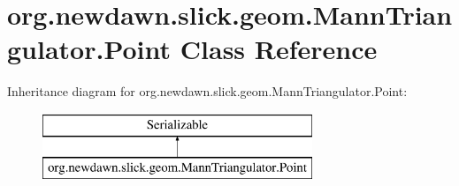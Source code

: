 \hypertarget{classorg_1_1newdawn_1_1slick_1_1geom_1_1_mann_triangulator_1_1_point}{}\section{org.\+newdawn.\+slick.\+geom.\+Mann\+Triangulator.\+Point Class Reference}
\label{classorg_1_1newdawn_1_1slick_1_1geom_1_1_mann_triangulator_1_1_point}
Inheritance diagram for org.\+newdawn.\+slick.\+geom.\+Mann\+Triangulator.\+Point\+:\begin{figure}[H]
\begin{center}
\leavevmode
\includegraphics[height=2.000000cm]{classorg_1_1newdawn_1_1slick_1_1geom_1_1_mann_triangulator_1_1_point}
\end{center}
\end{figure}
